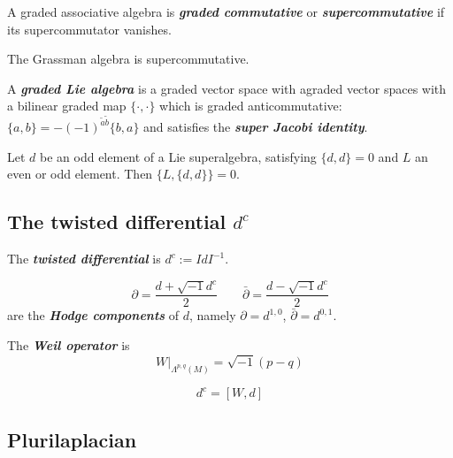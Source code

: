\begin{defn}\leavevmode
	A graded associative algebra is \textit{\textbf{graded commutative}} or \textit{\textbf{supercommutative}} if its supercommutator vanishes.
\end{defn}

\begin{example}\leavevmode
	The Grassman algebra is supercommutative.
\end{example}

\begin{defn}\leavevmode
	A \textit{\textbf{graded Lie algebra}} is a graded vector space with agraded vector spaces with a bilinear graded map $\{\cdot,\cdot\}$ which is graded anticommutative: $\{a,b\} =-(-1)^{\tilde{a}\tilde{b}}\{b,a\}$ and satisfies the \textit{\textbf{super Jacobi identity}}.
\end{defn}

\begin{lemma}\leavevmode
	Let $d$ be an odd element of a Lie superalgebra, satisfying $\{d,d\} =0$ and $L$ an even or odd element. Then $\{L,\{d,d\}\} =0.$
\end{lemma}

\subsection{The twisted differential $d^c$}

\begin{defn}\leavevmode
	The \textit{\textbf{twisted differential}} is $d^c:=Id I^{-1}$.
\end{defn}

\begin{claim}\leavevmode
	\[\partial =\dfrac{d+\sqrt{-1}d^c}{2}\qquad \bar\partial =\dfrac{d-\sqrt{-1}d^c}{2}\]
	are the \textit{\textbf{Hodge components}} of $d$, namely  $\partial =d^{1,0}$, $\bar\partial =d^{0,1}$.
\end{claim}

\begin{defn}\leavevmode
	The \textit{\textbf{Weil operator}} is 
	 \[W\Big|_{\Lambda^{p,q}(M)}=\sqrt{-1}(p-q)\]
\end{defn}

\begin{claim}\leavevmode
	\[d^c=[W,d]\]
\end{claim}

\subsection{Plurilaplacian}

